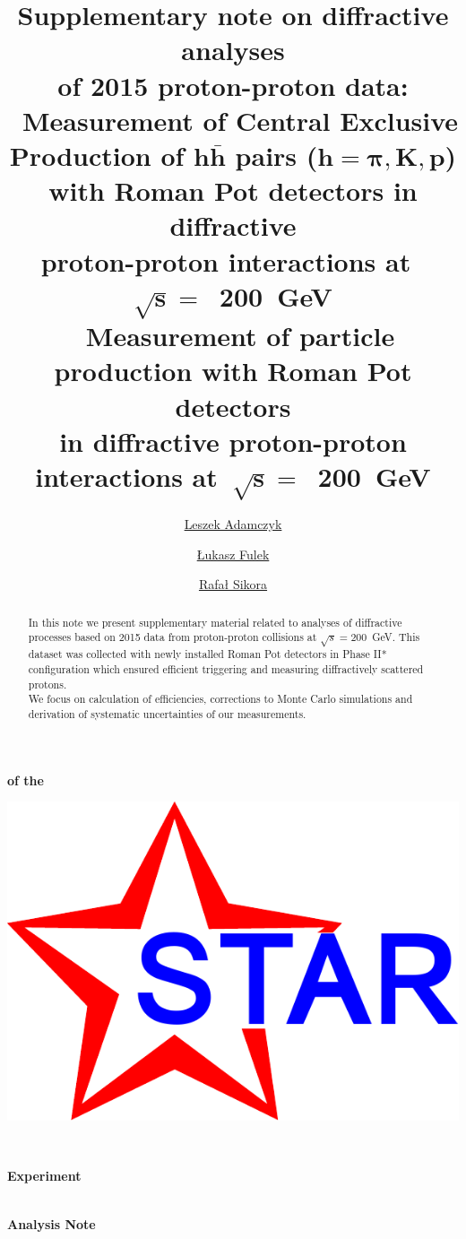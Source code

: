 \documentclass[a4paper,10pt,notitlepage]{report}
\title{\textbf{Supplementary note on diffractive analyses\\of 2015 proton-proton data:\\[20pt]\large{\cite{AnalysisNoteRafal}~Measurement of Central Exclusive Production of $\bm{h\bar{h}}$ pairs ($\bm{h=\pi,K,p}$) with Roman Pot detectors in diffractive\\proton-proton interactions at~$\bm{\sqrt{s}=}$~200~GeV\\[10pt]\cite{AnalysisNoteLukasz}~Measurement of particle production with Roman Pot detectors\\in diffractive proton-proton interactions at~$\bm{\sqrt{s}=}$~200~GeV\\}}\vspace*{10pt}}
\author[1]{\href{mailto:leszek.adamczyk@agh.edu.pl}{Leszek Adamczyk}}
\author[1]{\href{mailto:lukasz.fulek@fis.agh.edu.pl}{Łukasz Fulek}}
\author[1]{\href{mailto:rafal.sikora@fis.agh.edu.pl}{Rafał Sikora}}
\affil[1]{AGH University of Science and Technology, FPACS, Kraków, Poland}
\begin{document}
\begin{center}
\begin{minipage}[c]{0.12\linewidth}%
\vspace{5.5pt}\textbf{\LARGE{of the}}
\end{minipage}
\begin{minipage}[c]{0.15\linewidth}%
\hspace*{-8pt}\includegraphics[width=\linewidth]{graphics/STAR_logo.pdf}
\end{minipage}~
\begin{minipage}[c]{0.24\linewidth}%
\vspace{9pt}\hspace*{-8pt}\textbf{\LARGE{Experiment}}
\end{minipage}\\[-50pt]
\textbf{\LARGE{Analysis Note}}

\vspace*{125pt}
\begin{minipage}{\linewidth}
\maketitle
\begin{abstract}
In this note we present supplementary material related to analyses of diffractive processes based on 2015 data from proton-proton collisions at $\sqrt{s}=200$~GeV. This dataset was collected with newly installed Roman Pot detectors in Phase II* configuration which ensured efficient triggering and measuring diffractively scattered protons.\\\indent We focus on calculation of efficiencies, corrections to Monte Carlo simulations and derivation of systematic uncertainties of our measurements.
\end{abstract}
\thispagestyle{empty}
\end{minipage}


\end{center}
\end{document}
